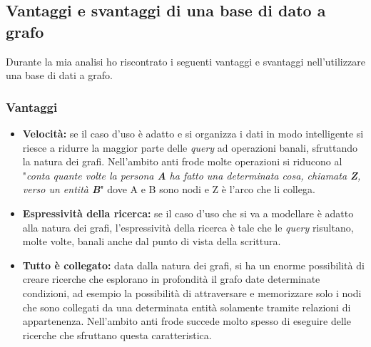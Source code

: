 \subsection{Vantaggi e svantaggi di una base di dato a grafo}
Durante la mia analisi ho riscontrato i seguenti vantaggi e svantaggi nell'utilizzare una base di dati a grafo.
\subsubsection{Vantaggi}
\begin{itemize}
\item{\textbf{Velocità:}} se il caso d'uso è adatto e si organizza i dati in modo intelligente si riesce a ridurre la maggior parte delle \textit{query} ad operazioni banali, sfruttando la natura dei grafi. Nell'ambito anti frode molte operazioni si riducono al "\textit{conta quante volte la persona \textbf{A} ha fatto una determinata cosa, chiamata \textbf{Z}, verso un entità \textbf{B}}" dove A e B sono nodi e Z è l'arco che li collega.
\item{\textbf{Espressività della ricerca:}} se il caso d'uso che si va a modellare è adatto alla natura dei grafi, l'espressività della ricerca è tale che le \textit{query} risultano, molte volte, banali anche dal punto di vista della scrittura.
\item{\textbf{Tutto è collegato:}} data dalla natura dei grafi, si ha un enorme possibilità di creare ricerche che esplorano in profondità il grafo date determinate condizioni, ad esempio la possibilità di attraversare e memorizzare solo i nodi che sono collegati da una determinata entità solamente tramite relazioni di appartenenza. Nell'ambito anti frode succede molto spesso di eseguire delle ricerche che sfruttano questa caratteristica.
\end{itemize}
